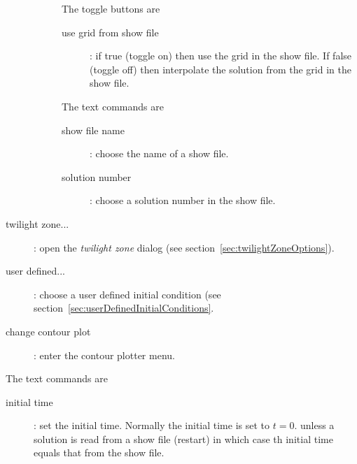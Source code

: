 \begin{description}
\begin{description}
        \noindent The toggle buttons are
       \begin{description}
         \item[\qquad use grid from show file] : if true (toggle on) then use the grid in the show file.
               If false (toggle off) then interpolate the solution from the grid in the show file.
       \end{description}

       \noindent The text commands are
       \begin{description}
         \item[\qquad show file name] : choose the name of a show file.
         \item[\qquad solution number] : choose a solution number in the show file.
       \end{description}
    \end{description}


  \item[\qquad twilight zone...] : open the {\em twilight zone} dialog (see section~\ref{sec:twilightZoneOptions}).
  \item[\qquad user defined...] : choose a user defined initial condition 
                (see section~\ref{sec:userDefinedInitialConditions}. 
  \item[\qquad change contour plot] : enter the contour plotter menu.
\end{description}

\noindent The text commands are
\begin{description}
  \item[\qquad initial time] : set the initial time. Normally the initial time is set to $t=0.$ unless a solution
        is read from a show file (restart) in which case th initial time equals that from the show file.  
\end{description}
